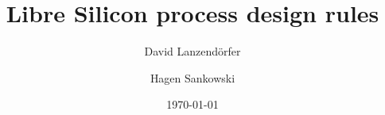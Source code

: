\documentclass[10pt,a4paper,oneside]{article}
\title{Libre Silicon process design rules}
\date{\today}
\author{
  David Lanzendörfer
  \and
  Hagen Sankowski
}
\newcounter{ct}
\begin{document}
\begin{abstract}
	
\end{abstract}
\newpage
\maketitle
\newpage

\newpage

\end{document}

